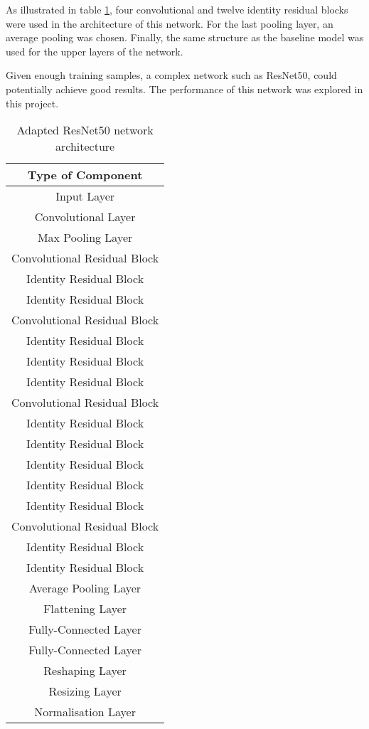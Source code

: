 As illustrated in table \ref{tab:resnet}, four convolutional and twelve identity residual blocks were used in the architecture of this network. For the last pooling layer, an average pooling was chosen. Finally, the same structure as the baseline model was used for the upper layers of the network.

Given enough training samples, a complex network such as ResNet50, could potentially achieve good results. The performance of this network was explored in this project.

\begin{table}[h]
\centering
\begin{tabular}{c}
Type of Component \\
\hline
Input Layer \\
Convolutional Layer \\
Max Pooling Layer \\
Convolutional Residual Block \\
Identity Residual Block \\
Identity Residual Block \\
Convolutional Residual Block \\
Identity Residual Block \\
Identity Residual Block \\
Identity Residual Block \\
Convolutional Residual Block \\
Identity Residual Block \\
Identity Residual Block \\
Identity Residual Block \\
Identity Residual Block \\
Identity Residual Block \\
Convolutional Residual Block \\
Identity Residual Block \\
Identity Residual Block \\
Average Pooling Layer \\
Flattening Layer \\
Fully-Connected Layer \\
Fully-Connected Layer \\
Reshaping Layer \\
Resizing Layer \\
Normalisation Layer\\
\end{tabular}
\caption{Adapted ResNet50 network architecture}
\label{tab:resnet}
\end{table} 
